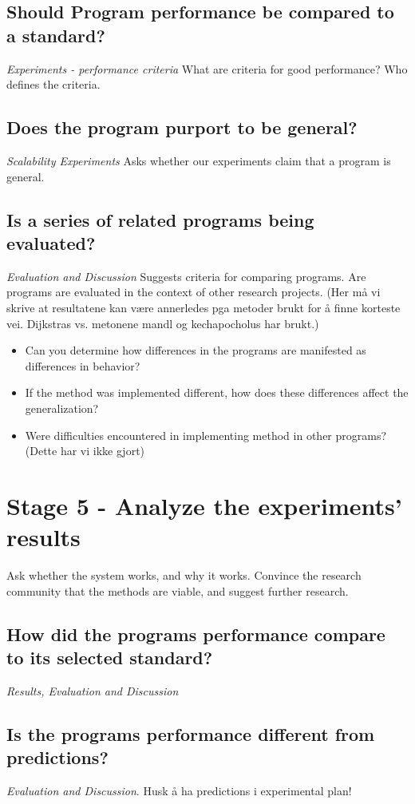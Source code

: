 \subsection{Should Program performance be compared to a standard? }
\emph{\color{orange} Experiments - performance criteria}
What are criteria for good performance? Who defines the criteria.

\subsection{Does the program purport to be general?}
\emph{\color{orange} Scalability Experiments}
Asks whether our experiments claim that a program is general.

\subsection{Is a series of related programs being evaluated?}
\emph{\color{orange} Evaluation and Discussion}
Suggests criteria for comparing programs. Are programs are evaluated in the context of other research projects.
(Her må vi skrive at resultatene kan være annerledes pga metoder brukt for å finne korteste vei. Dijkstras vs. metonene mandl og kechapocholus har brukt.)
\begin{itemize}
\item Can you determine how differences in the programs are manifested as differences in behavior?
\item If the method was implemented different, how does these differences affect the generalization?
\item Were difficulties encountered in implementing method in other programs? (Dette har vi ikke gjort)
\end{itemize}

\section{Stage 5 - Analyze the experiments' results}
Ask whether the system works, and why it works. Convince the research community that the methods are viable, and suggest further research.

\subsection{How did the programs performance compare to its selected standard?}
\emph{\color{orange} Results, Evaluation and Discussion}

\subsection{Is the programs performance different from predictions?}
\emph{\color{orange}Evaluation and Discussion}. Husk å ha predictions i experimental plan!

